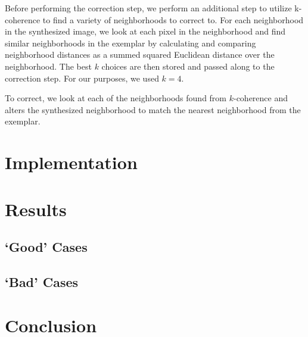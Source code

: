 \documentclass[12pt, twocolumn]{article}
\begin{document}
        Before performing the correction step, we perform an additional step to utilize k-coherence to find a variety of neighborhoods to correct to.  For each neighborhood in the synthesized image, we look at each pixel in the neighborhood and find similar neighborhoods in the exemplar by calculating and comparing neighborhood distances as a summed squared Euclidean distance over the neighborhood.  The best $k$ choices are then stored and passed along to the correction step.  For our purposes, we used $k=4$. \cite{ashikhmin, btf}

        To correct, we look at each of the neighborhoods found from $k$-coherence and alters the synthesized neighborhood to match the nearest neighborhood from the exemplar.  

    \section{Implementation}
    \section{Results}
        \subsection{`Good' Cases}
        \subsection{`Bad' Cases}
    \section{Conclusion}
    
    
    
\end{document}
